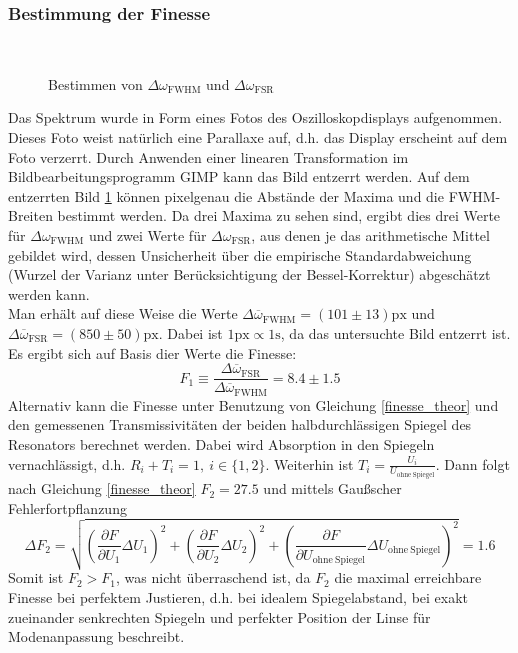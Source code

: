 \documentclass[11pt,a4paper,oneside]{scrartcl}
\begin{document}
\subsubsection{Bestimmung der Finesse}
\begin{figure}[H]
    \centering
  \\
   \caption{Bestimmen von $\Delta\omega_{\mathrm{FWHM}}$ und $\Delta\omega_{\mathrm{FSR}}$}
    \label{Bestimmen_Finesse_Fotostrecke}
\end{figure}
Das Spektrum wurde in Form eines Fotos des Oszilloskopdisplays aufgenommen. Dieses Foto weist natürlich eine Parallaxe auf, d.h. das Display erscheint auf dem Foto verzerrt. Durch Anwenden einer linearen Transformation im Bildbearbeitungsprogramm GIMP kann das Bild entzerrt werden. Auf dem entzerrten Bild \ref{Bestimmen_Finesse_Fotostrecke} können pixelgenau die Abstände der Maxima und die FWHM-Breiten bestimmt werden. Da drei Maxima zu sehen sind, ergibt dies drei Werte für $\Delta\omega_{\mathrm{FWHM}}$ und zwei Werte für $\Delta\omega_{\mathrm{FSR}}$, aus denen je das arithmetische Mittel gebildet wird, dessen Unsicherheit über die empirische Standardabweichung (Wurzel der Varianz unter Berücksichtigung der Bessel-Korrektur) abgeschätzt werden kann.\\
Man erhält auf diese Weise die Werte $\Delta\overline\omega_{\mathrm{FWHM}}=(101\pm13)\mathrm{px}$ und $\Delta\overline\omega_{\mathrm{FSR}}=(850\pm50)\mathrm{px}$. Dabei ist $1\mathrm{px}\propto 1\mathrm s$, da das untersuchte Bild entzerrt ist. \\
Es ergibt sich auf Basis dier Werte die Finesse:
\begin{equation}
F_1\equiv \frac{\Delta\overline\omega_{\mathrm{FSR}}}{\Delta\overline\omega_{\mathrm{FWHM}}}=8.4\pm1.5
\end{equation}
Alternativ kann die Finesse unter Benutzung von Gleichung \ref{finesse_theor} und den gemessenen Transmissivitäten der beiden halbdurchlässigen Spiegel des Resonators berechnet werden. Dabei wird Absorption in den Spiegeln vernachlässigt, d.h. $R_i+T_i=1,\ i\in\{1,2\}$. Weiterhin ist $T_i=\frac{U_i}{U_{\mathrm{ohne}\ \mathrm{Spiegel}}}$. Dann folgt nach Gleichung \ref{finesse_theor} $F_2=27.5$ und mittels Gaußscher Fehlerfortpflanzung \begin{equation}
\Delta F_2 = \sqrt{\left(\frac{\partial F}{\partial U_1}\Delta U_1\right)^2+\left(\frac{\partial F}{\partial U_2}\Delta U_2\right)^2+\left(\frac{\partial F}{\partial U_{\mathrm{ohne}\ \mathrm{Spiegel}}}\Delta U_{\mathrm{ohne}\ \mathrm{Spiegel}}\right)^2}=1.6
\end{equation}
Somit ist $F_2>F_1$, was nicht überraschend ist, da $F_2$ die maximal erreichbare Finesse bei perfektem Justieren, d.h. bei idealem Spiegelabstand, bei exakt zueinander senkrechten Spiegeln und perfekter Position der Linse für Modenanpassung beschreibt.
\end{document}
